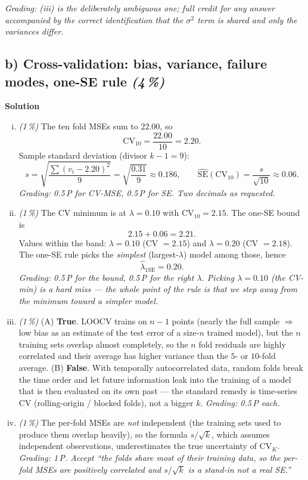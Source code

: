 \documentclass[11pt,a4paper]{article}
\newcommand{\subpoints}[1]{\textit{(#1\,\%)}}
\newcommand{\sol}{\noindent\textbf{Solution}}
\begin{document}
\emph{Grading: (iii) is the deliberately ambiguous one; full credit for any answer accompanied by
the correct identification that the $\sigma^2$ term is shared and only the variances differ.}

\subsection*{b) Cross-validation: bias, variance, failure modes, one-SE rule \subpoints{4}}
\sol{}
\begin{enumerate}[(i)]
  \item \subpoints{1} The ten fold MSEs sum to $22.00$, so
        $$\mathrm{CV}_{10} = \frac{22.00}{10} = \boxed{2.20}.$$
        Sample standard deviation (divisor $k-1 = 9$):
        $$s = \sqrt{\frac{\sum (v_i - 2.20)^2}{9}} = \sqrt{\frac{0.31}{9}} \approx 0.186,
          \qquad \widehat{\mathrm{SE}}(\mathrm{CV}_{10}) = \frac{s}{\sqrt{10}} \approx \boxed{0.06}.$$
        \emph{Grading: 0.5\,P for CV-MSE, 0.5\,P for SE. Two decimals as requested.}

  \item \subpoints{1} The CV minimum is at $\lambda = 0.10$ with $\mathrm{CV}_{10} = 2.15$.
        The one-SE bound is
        $$2.15 + 0.06 = \boxed{2.21}.$$
        Values within the band: $\lambda = 0.10$ (CV $= 2.15$) and $\lambda = 0.20$ (CV $= 2.18$).
        The one-SE rule picks the \emph{simplest} (largest-$\lambda$) model among those, hence
        $$\boxed{\hat\lambda_{1\mathrm{SE}} = 0.20}.$$
        \emph{Grading: 0.5\,P for the bound, 0.5\,P for the right $\lambda$. Picking $\lambda = 0.10$
        (the CV-min) is a hard miss --- the whole point of the rule is that we step away from the
        minimum toward a simpler model.}

  \item \subpoints{1} (A) \textbf{True}. LOOCV trains on $n-1$ points (nearly the full sample $\Rightarrow$
        low bias as an estimate of the test error of a size-$n$ trained model), but the $n$ training
        sets overlap almost completely, so the $n$ fold residuals are highly correlated and their
        average has higher variance than the $5$- or $10$-fold average.
        (B) \textbf{False}. With temporally autocorrelated data, random folds break the time order
        and let future information leak into the training of a model that is then evaluated on its
        own past --- the standard remedy is time-series CV (rolling-origin / blocked folds), not a
        bigger $k$.
        \emph{Grading: 0.5\,P each.}

  \item \subpoints{1} The per-fold MSEs are \emph{not} independent (the training sets used to
        produce them overlap heavily), so the formula $s/\sqrt{k}$, which assumes independent
        observations, underestimates the true uncertainty of $\mathrm{CV}_K$.
        \emph{Grading: 1\,P. Accept ``the folds share most of their training data, so the per-fold
        MSEs are positively correlated and $s/\sqrt{k}$ is a stand-in not a real SE.''}
\end{enumerate}
\end{document}
